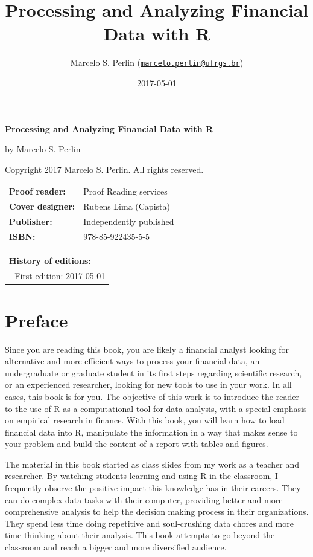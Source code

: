 \documentclass[11pt,]{book}
\title{Processing and Analyzing Financial Data with R}
\author{Marcelo S. Perlin
(\href{mailto:marcelo.perlin@ufrgs.br}{\nolinkurl{marcelo.perlin@ufrgs.br}})}
\date{2017-05-01}
\begin{document}
\maketitle

\thispagestyle{empty}

\textbf{Processing and Analyzing Financial Data with R}

by Marcelo S. Perlin

Copyright \textcopyright{} 2017 Marcelo S. Perlin. All rights reserved.

\vspace{0.75cm}

\begin{tabular}{l l}
	\textbf{Proof reader:} & Proof Reading services  \\
	\textbf{Cover designer:} & Rubens Lima (Capista)  \\
	\textbf{Publisher:} & Independently published \\
	\textbf{ISBN:} & 978-85-922435-5-5 \\
\end{tabular}

\vspace{0.5cm}

\begin{tabular}{l }
	\textbf{History of editions:} \\
	  {   - First edition: 2017-05-01}
\end{tabular}

{
\setcounter{tocdepth}{2}
\tableofcontents
}
\chapter*{Preface}\label{preface}

Since you are reading this book, you are likely a financial analyst
looking for alternative and more efficient ways to process your
financial data, an undergraduate or graduate student in its first steps
regarding scientific research, or an experienced researcher, looking for
new tools to use in your work. In all cases, this book is for you. The
objective of this work is to introduce the reader to the use of R as a
computational tool for data analysis, with a special emphasis on
empirical research in finance. With this book, you will learn how to
load financial data into R, manipulate the information in a way that
makes sense to your problem and build the content of a report with
tables and figures.

The material in this book started as class slides from my work as a
teacher and researcher. By watching students learning and using R in the
classroom, I frequently observe the positive impact this knowledge has
in their careers. They can do complex data tasks with their computer,
providing better and more comprehensive analysis to help the decision
making process in their organizations. They spend less time doing
repetitive and soul-crushing data chores and more time thinking about
their analysis. This book attempts to go beyond the classroom and reach
a bigger and more diversified audience.
\end{document}
